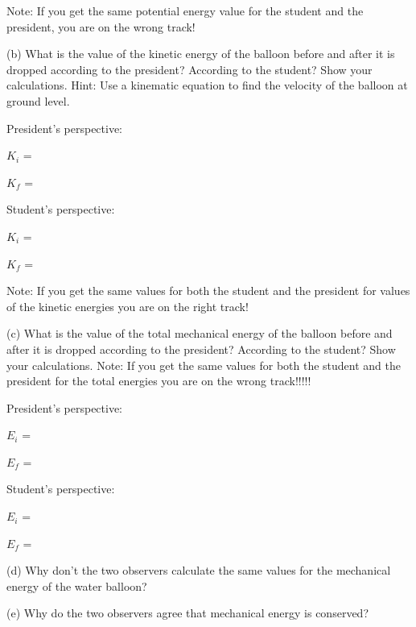 Note: If you get the same potential energy value for the student and the president,
you are on the wrong track!

(b) What is the value of the kinetic energy of the balloon before and after
it is dropped according to the president? According to the student? Show your
calculations. Hint: Use a kinematic equation to find the velocity of the balloon
at ground level.

President's perspective: 
\vspace{5mm}

\( K_{i} \) = 
\vspace{5mm}

\( K_{f} \) =

Student's perspective: 
\vspace{5mm}

\( K_{i} \) = 
\vspace{5mm}

\( K_{f} \) =
\vspace{5mm}

Note: If you get the same values for both the student and the president for
values of the kinetic energies you are on the right track!

(c) What is the value of the total mechanical energy of the balloon before and
after it is dropped according to the president? According to the student? Show
your calculations. Note: If you get the same values for both the student and
the president for the total energies you are on the wrong track!!!!!

President's perspective: 
\vspace{5mm}

\( E_{i} \) = 
\vspace{5mm}

\( E_{f} \) =
\vspace{5mm}

Student's perspective: 
\vspace{5mm}

\( E_{i} \) = 
\vspace{5mm}

\( E_{f} \) =
\vspace{5mm}

(d) Why don't the two observers calculate the same values for the mechanical
energy of the water balloon? 
\vspace{15mm}

(e) Why do the two observers agree that mechanical energy is conserved? 


